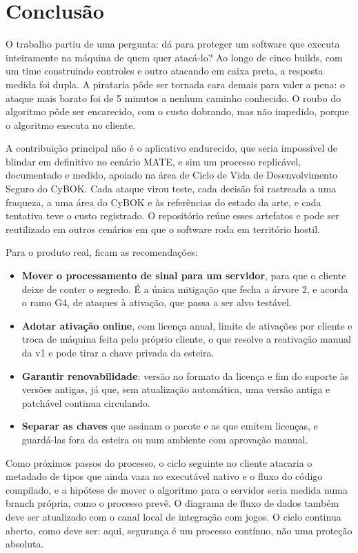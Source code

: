 \section{Conclusão}
\label{sec:conclusao}

O trabalho partiu de uma pergunta: dá para proteger um software que executa inteiramente na máquina de quem quer atacá-lo? Ao longo de cinco builds, com um time construindo controles e outro atacando em caixa preta, a resposta medida foi dupla. A pirataria pôde ser tornada cara demais para valer a pena: o ataque mais barato foi de 5 minutos a nenhum caminho conhecido. O roubo do algoritmo pôde ser encarecido, com o custo dobrando, mas não impedido, porque o algoritmo executa no cliente.

A contribuição principal não é o aplicativo endurecido, que seria impossível de blindar em definitivo no cenário MATE, e sim um processo replicável, documentado e medido, apoiado na área de Ciclo de Vida de Desenvolvimento Seguro do CyBOK. Cada ataque virou teste, cada decisão foi rastreada a uma fraqueza, a uma área do CyBOK e às referências do estado da arte, e cada tentativa teve o custo registrado. O repositório reúne esses artefatos e pode ser reutilizado em outros cenários em que o software roda em território hostil.

Para o produto real, ficam as recomendações:
\begin{itemize}
\item \textbf{Mover o processamento de sinal para um servidor}, para que o cliente deixe de conter o segredo. É a única mitigação que fecha a árvore 2, e acorda o ramo G4, de ataques à ativação, que passa a ser alvo testável.
\item \textbf{Adotar ativação online}, com licença anual, limite de ativações por cliente e troca de máquina feita pelo próprio cliente, o que resolve a reativação manual da v1 e pode tirar a chave privada da esteira.
\item \textbf{Garantir renovabilidade}: versão no formato da licença e fim do suporte às versões antigas, já que, sem atualização automática, uma versão antiga e patchável continua circulando.
\item \textbf{Separar as chaves} que assinam o pacote e as que emitem licenças, e guardá-las fora da esteira ou num ambiente com aprovação manual.
\end{itemize}

Como próximos passos do processo, o ciclo seguinte no cliente atacaria o metadado de tipos que ainda vaza no executável nativo e o fluxo do código compilado, e a hipótese de mover o algoritmo para o servidor seria medida numa branch própria, como o processo prevê. O diagrama de fluxo de dados também deve ser atualizado com o canal local de integração com jogos. O ciclo continua aberto, como deve ser: aqui, segurança é um processo contínuo, não uma proteção absoluta.
